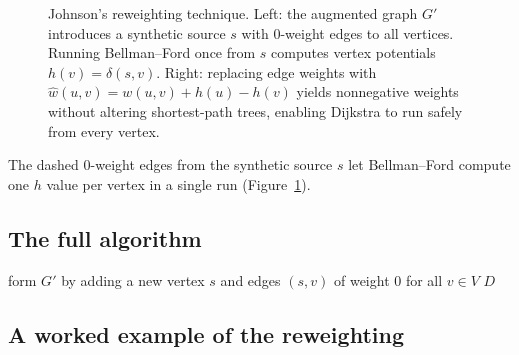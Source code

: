 \begin{figure}[H]
\caption{Johnson's reweighting technique. Left: the augmented graph $G'$ introduces a synthetic source $s$ with $0$-weight edges to all vertices. Running Bellman--Ford once from $s$ computes vertex potentials $h(v) = \delta(s,v)$. Right: replacing edge weights with $\hat{w}(u,v) = w(u,v) + h(u) - h(v)$ yields nonnegative weights without altering shortest-path trees, enabling Dijkstra to run safely from every vertex.}
\label{ch25:fig-johnson-source}
\end{figure}

The dashed $0$-weight edges from the synthetic source $s$ let Bellman--Ford
compute one $h$ value per vertex in a single run
(Figure~\ref{ch25:fig-johnson-source}).

\subsection{The full algorithm}

\begin{algorithm}[H]
\caption{\textsc{Johnson}($G$, $w$)}
form $G'$ by adding a new vertex $s$ and edges $(s, v)$ of weight $0$ for all $v \in V$\;
\Return $D$\;
\end{algorithm}

\subsection{A worked example of the reweighting}

